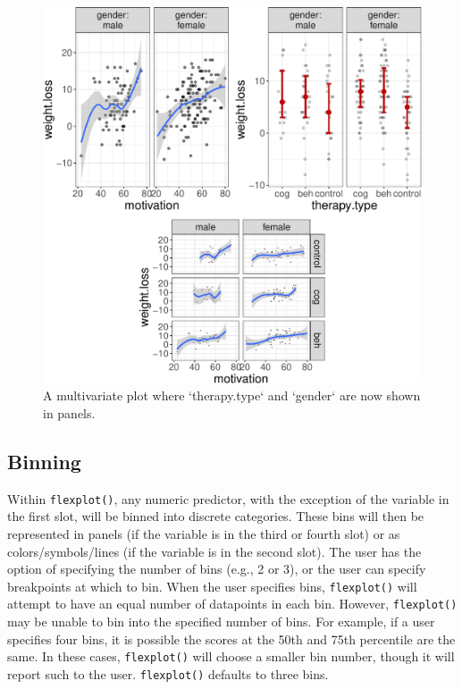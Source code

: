 \documentclass[
  man]{apa6}
\begin{document}
\begin{figure}

{\centering \includegraphics[width=1\linewidth]{flexplot_psychmeth_files/figure-latex/panels-1} 

}

\caption{A multivariate plot where `therapy.type` and `gender` are now shown in panels. \label{fig:panels}}\label{fig:panels}
\end{figure}

\hypertarget{binning}{%
\subsection{Binning}\label{binning}}

Within \texttt{flexplot()}, any numeric predictor, with the exception of the variable in the first slot, will be binned into discrete categories. These bins will then be represented in panels (if the variable is in the third or fourth slot) or as colors/symbols/lines (if the variable is in the second slot). The user has the option of specifying the number of bins (e.g., 2 or 3), or the user can specify breakpoints at which to bin. When the user specifies bins, \texttt{flexplot()} will attempt to have an equal number of datapoints in each bin. However, \texttt{flexplot()} may be unable to bin into the specified number of bins. For example, if a user specifies four bins, it is possible the scores at the 50th and 75th percentile are the same. In these cases, \texttt{flexplot()} will choose a smaller bin number, though it will report such to the user. \texttt{flexplot()} defaults to three bins.
\end{document}
